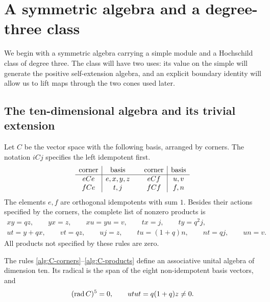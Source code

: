 \section{A symmetric algebra and a degree-three class}
\label{alg:section}

We begin with a symmetric algebra carrying a simple module and a
Hochschild class of degree three.  The class will have two uses: its
value on the simple will generate the positive self-extension algebra,
and an explicit boundary identity will allow us to lift maps through
the two cones used later.

\subsection{The ten-dimensional algebra and its trivial extension}

Let $C$ be the vector space with the following basis, arranged by
corners.  The notation $iCj$ specifies the left idempotent first.
\begin{equation}
\begin{array}{c|c@{\qquad}c|c}
 \text{corner}&\text{basis}&\text{corner}&\text{basis}\\ \hline
 eCe&e,x,y,z&eCf&u,v\\
 fCe&t,j&fCf&f,n
\end{array}
\label{alg:C-corners}
\end{equation}
The elements $e,f$ are orthogonal idempotents with sum $1$.  Besides
their actions specified by the corners, the complete list of nonzero
products is
\begin{equation}
\begin{gathered}
 xy=qz,\qquad yx=z,\qquad xu=yu=v,\qquad tx=j,\qquad ty=q^2j,\\
 ut=y+qx,\qquad vt=qz,\qquad uj=z,\qquad
 tu=(1+q)n,\qquad nt=qj,\qquad un=v.
\end{gathered}
\label{alg:C-products}
\end{equation}
All products not specified by these rules are zero.

\begin{lemma}\label{alg:C}
The rules \eqref{alg:C-corners}--\eqref{alg:C-products} define an
associative unital algebra of dimension ten.  Its radical is the span
of the eight non-idempotent basis vectors, and
\[
 (\operatorname{rad} C)^5=0,\qquad utut=q(1+q)z\ne0.
\]
\end{lemma}

